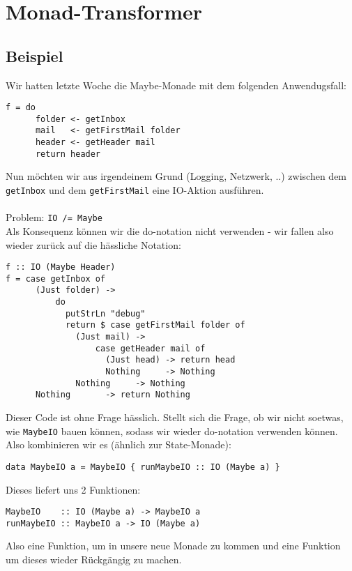 \documentclass{beamer}
\begin{document}
\section{Monad-Transformer}

\subsection{Beispiel}
\begin{frame}[fragile]
Wir hatten letzte Woche die Maybe-Monade mit dem folgenden Anwendugsfall:
\begin{verbatim}
f = do
      folder <- getInbox
      mail   <- getFirstMail folder
      header <- getHeader mail
      return header
\end{verbatim}
Nun möchten wir aus irgendeinem Grund (Logging, Netzwerk, ..) zwischen dem \texttt{getInbox} und dem \texttt{getFirstMail} eine IO-Aktion ausführen.\\
~\\
Problem: \texttt{IO /= Maybe}\\
\pause
Als Konsequenz können wir die do-notation nicht verwenden - wir fallen also wieder zurück auf die hässliche Notation:
\end{frame}

\begin{frame}[fragile]
\begin{verbatim}
f :: IO (Maybe Header)
f = case getInbox of
      (Just folder) -> 
          do
            putStrLn "debug"
            return $ case getFirstMail folder of
              (Just mail) -> 
                  case getHeader mail of
                    (Just head) -> return head
                    Nothing     -> Nothing
              Nothing     -> Nothing
      Nothing       -> return Nothing
\end{verbatim}
\end{frame}

\begin{frame}[fragile]
Dieser Code ist ohne Frage hässlich. Stellt sich die Frage, ob wir nicht soetwas, wie \texttt{MaybeIO} bauen können, sodass wir wieder do-notation verwenden können.\\
\pause
Also kombinieren wir es (ähnlich zur State-Monade):
\begin{verbatim}
data MaybeIO a = MaybeIO { runMaybeIO :: IO (Maybe a) }
\end{verbatim}
\pause
Dieses liefert uns 2 Funktionen:
\begin{verbatim}
MaybeIO    :: IO (Maybe a) -> MaybeIO a
runMaybeIO :: MaybeIO a -> IO (Maybe a)
\end{verbatim}
Also eine Funktion, um in unsere neue Monade zu kommen und eine Funktion um dieses wieder Rückgängig zu machen.
\end{frame}
\end{document}

